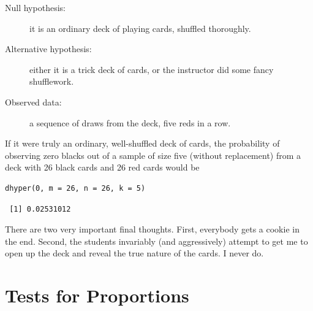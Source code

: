\documentclass[captions=tableheading]{scrbook}
\begin{document}
\begin{description}
\item[Null hypothesis:] it is an ordinary deck of playing cards, shuffled thoroughly.
\item[Alternative hypothesis:] either it is a trick deck of cards, or the instructor did some fancy shufflework.
\item[Observed data:] a sequence of draws from the deck, five reds in a row.
\end{description}

If it were truly an ordinary, well-shuffled deck of cards, the probability of observing zero blacks out of a sample of size five (without replacement) from a deck with 26 black cards and 26 red cards would be


\begin{verbatim}
dhyper(0, m = 26, n = 26, k = 5)
\end{verbatim}

\begin{verbatim}
 [1] 0.02531012
\end{verbatim}

There are two very important final thoughts. First, everybody gets a cookie in the end. Second, the students invariably (and aggressively) attempt to get me to open up the deck and reveal the true nature of the cards. I never do.
\section{Tests for Proportions}
\label{sec-10-2}
\label{sec-Tests-for-Proportions}
\end{document}
